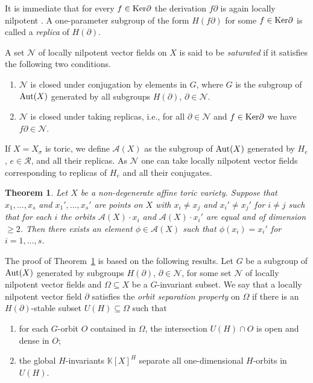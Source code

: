 \documentclass[12pt,a4paper]{amsart}
\theoremstyle{plain}
\newtheorem{theorem}{Theorem}
\theoremstyle{definition}
\begin{document}
It is immediate that for every $f\in{\mathop{\rm Ker}}\partial$
the derivation $f\partial$ is again locally nilpotent \cite[1.4, Pripciple~7]{Fr}.
A one-parameter subgroup of the form $H(f\partial)$ for some $f\in{\mathop{\rm Ker}}\partial$
is called a {\it replica} of $H(\partial)$.

A set ${{\mathcal{N}}}$ of locally nilpotent vector fields on $X$ is said to be {\it saturated}
if it satisfies the following two conditions.
\begin{enumerate}
\item
${{\mathcal{N}}}$ is closed under conjugation by elements in $G$, where $G$ is the subgroup
of ${\mathop{\rm Aut}}(X)$ generated by all subgroups $H(\partial)$, $\partial\in{{\mathcal{N}}}$.
\item
${{\mathcal{N}}}$ is closed under taking replicas, i.e., for all $\partial\in{{\mathcal{N}}}$ and
$f\in{\mathop{\rm Ker}}\partial$  we have $f\partial\in{{\mathcal{N}}}$.
\end{enumerate}

If $X=X_{\sigma}$ is toric, we define ${{\mathcal{A}}}(X)$ as the subgroup of ${\mathop{\rm Aut}}(X)$
generated by $H_e$, $e\in\mathcal{R}$, and all their replicas. As ${{\mathcal{N}}}$ one can take
locally nilpotent vector fields corresponding to replicas of $H_e$ and all their conjugates.

\begin{theorem} \label{thcit}
Let $X$ be a non-degenerate affine toric variety. Suppose that
$x_1,\ldots,x_s$ and $x_1',\ldots,x_s'$ are points on $X$ with
$x_i\ne x_j$ and $x_i'\ne x_j'$ for $i\ne j$ such that for each $i$
the orbits ${{\mathcal{A}}}(X)\cdot x_i$ and ${{\mathcal{A}}}(X)\cdot x_i'$ are equal
and of dimension $\ge 2$. Then there exists an element $\phi\in{{\mathcal{A}}}(X)$
such that $\phi(x_i)=x_i'$ for $i=1,\ldots,s$.
\end{theorem}

The proof of Theorem~\ref{thcit} is based on the following results.
Let $G$ be a subgroup of ${\mathop{\rm Aut}}(X)$ generated by subgroups $H(\partial)$, $\partial\in{{\mathcal{N}}}$,
for some set ${{\mathcal{N}}}$ of locally nilpotent vector fields and $\Omega\subseteq X$ be a
$G$-invariant subset.
We say that a locally nilpotent vector field $\partial$ satisfies the
{\it orbit separation property} on $\Omega$ if there is an $H(\partial)$-stable subset
$U(H)\subseteq\Omega$ such that
\begin{enumerate}
\item
for each $G$-orbit $O$ contained in $\Omega$, the intersection $U(H)\cap O$
is open and dense in $O$;
\item
the global $H$-invariants ${{\mathbb K}}[X]^H$ separate all one-dimensional $H$-orbits in $U(H)$.
\end{enumerate}
\end{document}
